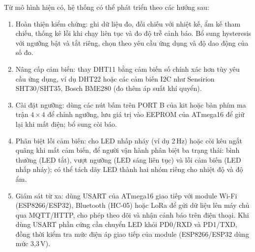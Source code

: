 Từ mô hình hiện có, hệ thống có thể phát triển theo các hướng sau:
\begin{enumerate}[leftmargin=1.2cm]
    \item Hoàn thiện kiểm chứng: ghi dữ liệu đo, đối chiếu với nhiệt kế, ẩm kế tham chiếu, thống kê lỗi khi chạy liên tục và đo độ trễ cảnh báo. Bổ sung hysteresis với ngưỡng bật và tắt riêng, chọn theo yêu cầu ứng dụng và độ dao động của số đo.
    \item Nâng cấp cảm biến: thay DHT11 bằng cảm biến số chính xác hơn tùy yêu cầu ứng dụng, ví dụ DHT22 hoặc các cảm biến I2C như Sensirion SHT30/SHT35, Bosch BME280 (đo thêm áp suất khí quyển).
    \item Cài đặt ngưỡng: dùng các nút bấm trên PORT B của kit hoặc bàn phím ma trận $4 \times 4$ để chỉnh ngưỡng, lưu giá trị vào EEPROM của ATmega16 để giữ lại khi mất điện; bổ sung còi báo.
    \item Phân biệt lỗi cảm biến: cho LED nhấp nháy (ví dụ 2\,Hz) hoặc còi kêu ngắt quãng khi mất cảm biến, để người vận hành phân biệt ba trạng thái: bình thường (LED tắt), vượt ngưỡng (LED sáng liên tục) và lỗi cảm biến (LED nhấp nháy); có thể tách dãy LED thành hai nhóm riêng cho nhiệt độ và độ ẩm.
    \item Giám sát từ xa: dùng USART của ATmega16 giao tiếp với module Wi-Fi (ESP8266/ESP32), Bluetooth (HC-05) hoặc LoRa để gửi dữ liệu lên máy chủ qua MQTT/HTTP, cho phép theo dõi và nhận cảnh báo trên điện thoại. Khi dùng USART phần cứng cần chuyển LED khỏi PD0/RXD và PD1/TXD, đồng thời kiểm tra mức điện áp giao tiếp của module (ESP8266/ESP32 dùng mức 3,3\,V).
\end{enumerate}
